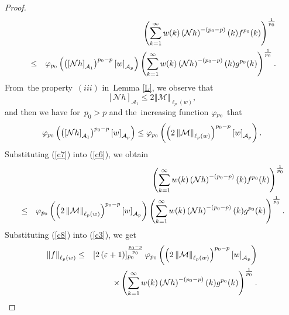 \documentclass[a4paper]{amsart}
\theoremstyle{plain}
\numberwithin{equation}{section}
\begin{document}
\begin{proof}
\begin{eqnarray}
&&\left( \sum_{k=1}^{\infty }w(k)\left( \mathcal{N}h\right) ^{-\left(
p_{0}-p\right) }(k)f^{p_{0}}(k)\right) ^{\frac{1}{p_{0}}}  \notag \\
&\leq &\mathcal{\varphi }_{p_{0}}\left( \left( \left[ \mathcal{N}h\right] _{%
\mathcal{A}_{1}}\right) ^{p_{0}-p}\left[ w\right] _{\mathcal{A}_{p}}\right)
\left( \sum_{k=1}^{\infty }w(k)\left( \mathcal{N}h\right) ^{-\left(
p_{0}-p\right) }(k)g^{p_{0}}(k)\right) ^{\frac{1}{p_{0}}}.  \label{c6}
\end{eqnarray}%
From\ the property\ $(iii)$ in\ Lemma \ref{L}, we observe that%
\begin{equation*}
\left[ \mathcal{N}h\right] _{\mathcal{A}_{1}}\leq 2\left\Vert \mathcal{M}%
\right\Vert _{\ell _{p}(w)},
\end{equation*}%
and then we have for\ $p_{0}>p$ and the\ increasing function $\mathcal{%
\varphi }_{p_{0}}$ that%
\begin{equation}
\mathcal{\varphi }_{p_{0}}\left( \left( \left[ \mathcal{N}h\right] _{%
\mathcal{A}_{1}}\right) ^{p_{0}-p}\left[ w\right] _{\mathcal{A}_{p}}\right)
\leq \mathcal{\varphi }_{p_{0}}\left( \left( 2\left\Vert \mathcal{M}%
\right\Vert _{\ell _{p}(w)}\right) ^{p_{0}-p}\left[ w\right] _{\mathcal{A}%
_{p}}\right) .  \label{c7}
\end{equation}%
Substituting (\ref{c7}) into (\ref{c6}), we obtain%
\begin{eqnarray}
&&\left( \sum_{k=1}^{\infty }w(k)\left( \mathcal{N}h\right) ^{-\left(
p_{0}-p\right) }(k)f^{p_{0}}(k)\right) ^{\frac{1}{p_{0}}}  \notag \\
&\leq &\mathcal{\varphi }_{p_{0}}\left( \left( 2\left\Vert \mathcal{M}%
\right\Vert _{\ell _{p}(w)}\right) ^{p_{0}-p}\left[ w\right] _{\mathcal{A}%
_{p}}\right) \left( \sum_{k=1}^{\infty }w(k)\left( \mathcal{N}h\right)
^{-\left( p_{0}-p\right) }(k)g^{p_{0}}(k)\right) ^{\frac{1}{p_{0}}}.
\label{c8}
\end{eqnarray}%
Substituting (\ref{c8}) into (\ref{c3}), we get%
\begin{eqnarray}
\left\Vert f\right\Vert _{\ell _{p}(w)} &\leq &\left[ 2\left( \varepsilon
+1\right) \right] _{p_{0}}^{\frac{p_{0}-p}{p_{0}}}\mathcal{\varphi }%
_{p_{0}}\left( \left( 2\left\Vert \mathcal{M}\right\Vert _{\ell
_{p}(w)}\right) ^{p_{0}-p}\left[ w\right] _{\mathcal{A}_{p}}\right)  \notag
\\
&&\times \left( \sum_{k=1}^{\infty }w(k)\left( \mathcal{N}h\right) ^{-\left(
p_{0}-p\right) }(k)g^{p_{0}}(k)\right) ^{\frac{1}{p_{0}}}.  \label{c9}

\end{eqnarray}
\end{proof}
\end{document}
